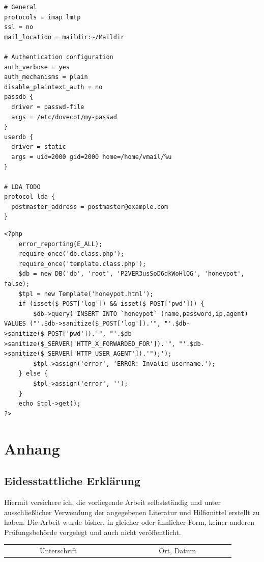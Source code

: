 \documentclass[a4paper,11pt,singlespacing]{article}
\begin{document}
\begin{lstlisting}[label={lst:DovecotKonfiguration},caption={Dovecot Konfiguration}]
# General
protocols = imap lmtp
ssl = no
mail_location = maildir:~/Maildir

# Authentication configuration
auth_verbose = yes
auth_mechanisms = plain
disable_plaintext_auth = no
passdb {
  driver = passwd-file
  args = /etc/dovecot/my-passwd
}
userdb {
  driver = static
  args = uid=2000 gid=2000 home=/home/vmail/%u
}

# LDA TODO
protocol lda {
  postmaster_address = postmaster@example.com
}
\end{lstlisting}

\begin{lstlisting}[label={lst:PHP-Script},caption={PHP-Script}]
<?php
    error_reporting(E_ALL);
	require_once('db.class.php');
	require_once('template.class.php');
	$db = new DB('db', 'root', 'P2VER3usSoD6dkWoHlQG', 'honeypot', false);
	$tpl = new Template('honeypot.html');
	if (isset($_POST['log']) && isset($_POST['pwd'])) {
	    $db->query('INSERT INTO `honeypot` (name,password,ip,agent) VALUES ("'.$db->sanitize($_POST['log']).'", "'.$db->sanitize($_POST['pwd']).'", "'.$db->sanitize($_SERVER['HTTP_X_FORWARDED_FOR']).'", "'.$db->sanitize($_SERVER['HTTP_USER_AGENT']).'");');
	    $tpl->assign('error', 'ERROR: Invalid username.');
	} else {
	    $tpl->assign('error', '');
	}
	echo $tpl->get();
?>
\end{lstlisting}

\newpage


\section*{Anhang}\label{Anhang}
\newpage


\begin{newpage}
\vspace*{\fill}
\section*{Eidesstattliche Erklärung}\label{sec:Eidesstattliche Erklärung}
	Hiermit versichere ich, die vorliegende Arbeit selbstständig und unter ausschlie{\ss}licher Verwendung der angegebenen Literatur und Hilfsmittel erstellt zu haben. Die Arbeit wurde bisher, in gleicher oder ähnlicher Form, keiner anderen Prüfungsbehörde vorgelegt und auch nicht veröffentlicht.\\

\vspace{3cm}
\begin{tabular*}{\textwidth}{c@{\extracolsep\fill}cc}
\cline{1-1}
\cline{3-3}
\\
\ \ \ \ \ \ \ \ \ Unterschrift\ \ \ \ \ \ \ \ \ \ & & \ \ \ \ \ \ \ \ \ Ort, Datum\ \ \ \ \ \ \ \ \ \\
\end{tabular*}
\end{newpage}
\end{document}
